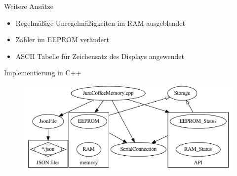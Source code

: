 \documentclass[
  de, %
  inputenc=utf8,
]{tuhhslides}
\begin{document}
\begin{frame}{Weitere Ansätze}
  \begin{itemize}
    \item Regelmäßige Unregelmäßigkeiten im RAM ausgeblendet
    \item Zähler im EEPROM verändert
    \item ASCII Tabelle für Zeichensatz des Displays angewendet
  \end{itemize}
\end{frame}

\begin{frame}{Implementierung in C++}
  \begin{figure}
    \begin{center}
      \hspace*{-0.9cm}
      \includegraphics[scale=0.65]{Material/class-structure}
    \end{center}
  \end{figure}
\end{frame}
\end{document}
